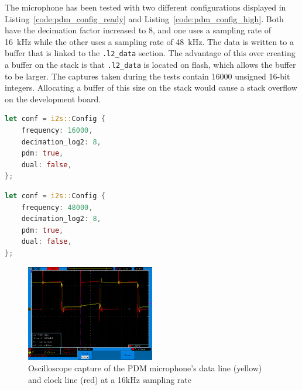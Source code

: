 \begin{minipage}{\textwidth}
The microphone has been tested with two different configurations displayed in Listing~\ref{code:pdm_config_ready} and Listing~\ref{code:pdm_config_high}.
Both have the decimation factor increased to 8, and one uses a sampling rate of \SI{16}{\kilo\hertz} while the other uses a sampling rate of \SI{48}{\kilo\hertz}.
The data is written to a buffer that is linked to the \lstinline{.l2_data} section.
The advantage of this over creating a buffer on the stack is that \lstinline{.l2_data} is located on flash, which allows the buffer to be larger.
The captures taken during the tests contain 16000 unsigned 16-bit integers.
Allocating a buffer of this size on the stack would cause a stack overflow on the development board.

\begin{lstlisting}[style=colorEX,language=Rust,caption={Updated configuration of the PDM microphone with a 16kHz sampling rate},label={code:pdm_config_ready}]
let conf = i2s::Config {
    frequency: 16000,
    decimation_log2: 8,
    pdm: true,
    dual: false,
};
\end{lstlisting}

\begin{lstlisting}[style=colorEX,language=Rust,caption={Updated configuration of the PDM microphone with a 48kHz sampling rate},label={code:pdm_config_high}]
let conf = i2s::Config {
    frequency: 48000,
    decimation_log2: 8,
    pdm: true,
    dual: false,
};
\end{lstlisting}
\end{minipage}

\begin{figure}[H]
    \begin{center}
        \includegraphics[width=0.5\textwidth]{figures/16k_1mhz_sine.png}
    \end{center}
    \caption[Oscilloscope capture of the PDM microphone's data line (yellow) and clock line (red) at a 16kHz sampling rate]
    {Oscilloscope capture of the PDM microphone's data line (yellow) and clock line (red) at a 16kHz sampling rate}
    \label{fig:pdm_16k}
\end{figure}

